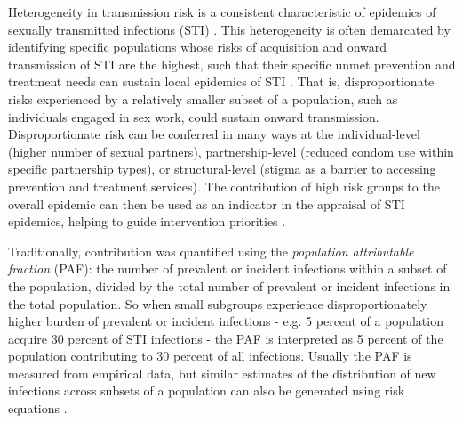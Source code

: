 Heterogeneity in transmission risk is a consistent characteristic of
epidemics of sexually transmitted infections (STI) \citep{Anderson1991}.
This heterogeneity is often demarcated by identifying
specific populations whose risks of acquisition and onward transmission of STI are the highest,
such that their specific unmet prevention and treatment needs
can sustain local epidemics of STI \citep{Yorke1978}.
That is, disproportionate risks experienced by a relatively smaller subset
of a population, such as individuals engaged in sex work, could sustain onward transmission.
Disproportionate risk can be conferred in many ways at the
individual-level (higher number of sexual partners), 
partnership-level (reduced condom use within specific partnership types), 
or structural-level (stigma as a barrier to accessing prevention and treatment services). %
The contribution of high risk groups to the overall epidemic
can then be used as an indicator in the appraisal of STI epidemics,
helping to guide intervention priorities
\citep{Shubber2014,Mishra2016}.
\par
Traditionally, contribution was quantified using the
\textit{population attributable fraction} (PAF):		%
the number of prevalent or incident infections
within a subset of the population, divided by the total number of 
prevalent or incident infections in the total population. %
So when small subgroups experience disproportionately higher burden of prevalent 
or incident infections - e.g. 5 percent of a population acquire 30 percent 
of STI infections - the PAF is interpreted as 5 percent of the population contributing to  %
30 percent of all infections. Usually the PAF is measured from empirical data, 
but similar estimates of the distribution of new infections across subsets of a population can also 
be generated using risk equations  \citep{Case2012,Mishra2014a}.
